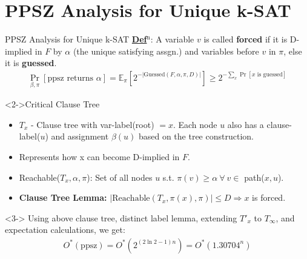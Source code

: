\documentclass[
	xcolor={svgnames},
	hyperref={pagebackref,bookmarks},
	aspectratio=43,
]{beamer}
\begin{document}
\section{PPSZ Analysis for Unique k-SAT}
\begin{frame}{PPSZ Analysis for Unique k-SAT\footnotemark[4]}
	\vspace{-2.3mm}
	\underline{\textbf{Def$^\text{n}$}}: A variable $v$ is called \textbf{forced} if it is D-implied in $F$ by $\alpha$ (the unique satisfying assgn.) and variables before $v$ in $\pi$, else it is \textbf{guessed}. \vspace{-3.5mm}
	\begin{align}
		\underset{\beta, \pi}{\operatorname{Pr}}[\text{ppsz returns }\alpha] = \mathbb{E}_{\pi}[2^{-|\text{Guessed}(F, \alpha, \pi, D)|}] \geq 2^{-\sum\limits_x\operatorname{Pr}[x \text{ is guessed}]}
	\end{align}
	\vspace{-6mm}
	\begin{block}<2->{Critical Clause Tree}
		\vspace{-1.5mm}
		\begin{itemize}
			\setlength\itemsep{0.5mm}
			\item $T_x$ - Clause tree with var-label(root) $ = x$. Each node $u$ also has a clause-label($u$) and assignment $\beta(u)$ based on the tree construction.
			\item Represents how x can become D-implied in $F$.
			\item Reachable($T_x, \alpha, \pi$): Set of all nodes $u$ s.t.\! $\pi(v)\! \geq\! \alpha\ \forall\ v\! \in\!$ path($x, u$).
			\item \textbf{Clause Tree Lemma:} $|\text{Reachable}(T_x, \pi(x), \pi)| \leq D \Rightarrow x$ is forced.
		\end{itemize}
	\end{block}
	\vspace{-3mm}
	\begin{block}<3->{}
		Using above clause tree, distinct label lemma, extending $T'_x$ to $T_\infty$, and expectation calculations, we get:
		\vspace{-3mm}
		\begin{align}
			O^*(\text{ppsz}) = O^*(2^{(2 \ln 2 - 1)n}) = O^*(1.30704^n)
		\end{align}
	\end{block}
	
\end{frame}
\end{document}
